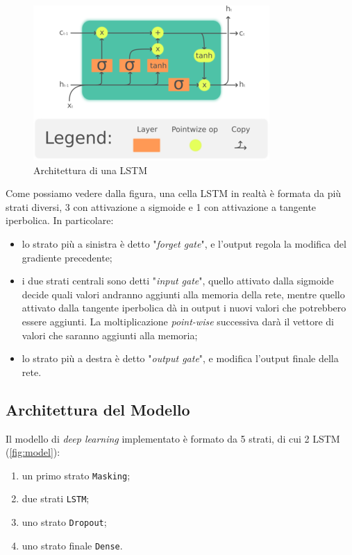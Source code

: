 \documentclass[8pt,notitlepage]{report}
\begin{document}
		\begin{figure}[H]
			\begin{center}
				\includegraphics[scale=2.2]{lstm}
				\caption{Architettura di una LSTM}
			\end{center}
		\end{figure}		
		
		Come possiamo vedere dalla figura, una cella LSTM in realtà è formata da più strati diversi, 3 con attivazione a sigmoide e 1 con attivazione a tangente iperbolica.
		In particolare:
		\begin{itemize}
			\item lo strato più a sinistra è detto "\textit{forget gate}", e l'output regola la modifica del gradiente precedente;
			\item i due strati centrali sono detti "\textit{input gate}", quello attivato dalla sigmoide decide quali valori andranno aggiunti alla memoria della rete, mentre quello attivato dalla tangente iperbolica dà in output i nuovi valori che potrebbero essere aggiunti. La moltiplicazione \textit{point-wise} successiva darà il vettore di valori che saranno aggiunti alla memoria; 
			\item lo strato più a destra è detto "\textit{output gate}", e modifica l'output finale della rete.
		\end{itemize}
		
		\subsection{Architettura del Modello}
			Il modello di \textit{deep learning} implementato è formato da 5 strati, di cui 2 LSTM (\cref{fig:model}):
			\begin{enumerate}
				\item un primo strato \verb|Masking|;
				\item due strati \verb|LSTM|;
				\item uno strato \verb|Dropout|;
				\item uno strato finale \verb|Dense|.
			\end{enumerate}
			
\end{document}
